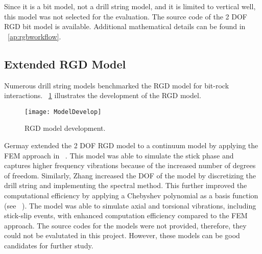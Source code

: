 Since it is a bit model, not a drill string model, and it is limited to vertical well, this model was not selected for the evaluation. The source code of the 2 DOF RGD bit model is available.  Additional mathematical details can be found in \appendixname~\ref{ap:rgbworkflow}.

\subsection{Extended RGD Model}
Numerous drill string models benchmarked the RGD model for bit-rock interactions. \figurename~\ref{model_develop_figure} illustrates the development of the RGD model.
\begin{figure}
  \centering
  \texttt{[image: ModelDevelop]}
  \caption[RGD model development]{RGD model development.}\label{model_develop_figure}
\end{figure}
Germay extended the 2 DOF RGD model to a continuum model by applying the FEM approach in ~\cite{ref:germay2009a}. This model was able to simulate the stick phase and captures higher frequency vibrations because of the increased number of degrees of freedom. Similarly, Zhang increased the DOF of the model by discretizing the drill string and implementing the spectral method. This further improved the computational efficiency by applying a Chebyshev polynomial as a basis function (see ~\cite{ref:zhang2020a}). The model was able to simulate axial and torsional vibrations, including stick-slip events, with enhanced computation efficiency compared to the FEM approach. The source codes for the models were not provided, therefore, they could not be evalutated in this project. However, these models can be good candidates for further study. 